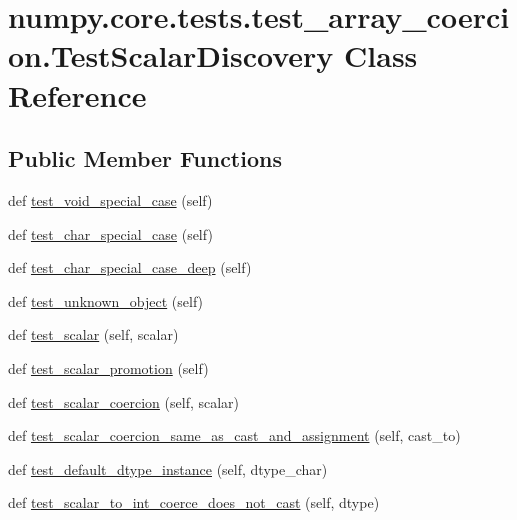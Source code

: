 \hypertarget{classnumpy_1_1core_1_1tests_1_1test__array__coercion_1_1TestScalarDiscovery}{}\section{numpy.\+core.\+tests.\+test\+\_\+array\+\_\+coercion.\+Test\+Scalar\+Discovery Class Reference}
\label{classnumpy_1_1core_1_1tests_1_1test__array__coercion_1_1TestScalarDiscovery}
\subsection*{Public Member Functions}
\begin{DoxyCompactItemize}
\item 
def \hyperlink{classnumpy_1_1core_1_1tests_1_1test__array__coercion_1_1TestScalarDiscovery_a34d04da83dd630778aad4fc84fd4957f}{test\+\_\+void\+\_\+special\+\_\+case} (self)
\item 
def \hyperlink{classnumpy_1_1core_1_1tests_1_1test__array__coercion_1_1TestScalarDiscovery_aa6f6a6903be7e21c903d692df6544c00}{test\+\_\+char\+\_\+special\+\_\+case} (self)
\item 
def \hyperlink{classnumpy_1_1core_1_1tests_1_1test__array__coercion_1_1TestScalarDiscovery_ae16a92f80153f7f3f883f1901dd790e9}{test\+\_\+char\+\_\+special\+\_\+case\+\_\+deep} (self)
\item 
def \hyperlink{classnumpy_1_1core_1_1tests_1_1test__array__coercion_1_1TestScalarDiscovery_a3f02cb70e6e6ac4c95830cf463822b25}{test\+\_\+unknown\+\_\+object} (self)
\item 
def \hyperlink{classnumpy_1_1core_1_1tests_1_1test__array__coercion_1_1TestScalarDiscovery_ada03455d50a4145dd185dc9f1f0682cf}{test\+\_\+scalar} (self, scalar)
\item 
def \hyperlink{classnumpy_1_1core_1_1tests_1_1test__array__coercion_1_1TestScalarDiscovery_a750fc491fc9efec84b0c9d65715818b6}{test\+\_\+scalar\+\_\+promotion} (self)
\item 
def \hyperlink{classnumpy_1_1core_1_1tests_1_1test__array__coercion_1_1TestScalarDiscovery_ad2d3354e678792f3d047f22334b32a87}{test\+\_\+scalar\+\_\+coercion} (self, scalar)
\item 
def \hyperlink{classnumpy_1_1core_1_1tests_1_1test__array__coercion_1_1TestScalarDiscovery_aea9a2ae7965c187c00615da35eec4d4a}{test\+\_\+scalar\+\_\+coercion\+\_\+same\+\_\+as\+\_\+cast\+\_\+and\+\_\+assignment} (self, cast\+\_\+to)
\item 
def \hyperlink{classnumpy_1_1core_1_1tests_1_1test__array__coercion_1_1TestScalarDiscovery_a87af1520d853288839e791e72c9b8275}{test\+\_\+default\+\_\+dtype\+\_\+instance} (self, dtype\+\_\+char)
\item 
def \hyperlink{classnumpy_1_1core_1_1tests_1_1test__array__coercion_1_1TestScalarDiscovery_ae08558ba97c4a59baaae6563e495c93d}{test\+\_\+scalar\+\_\+to\+\_\+int\+\_\+coerce\+\_\+does\+\_\+not\+\_\+cast} (self, dtype)
\end{DoxyCompactItemize}

